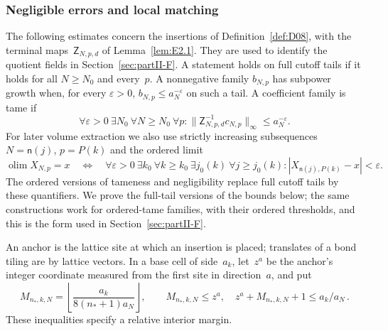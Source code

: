 \subsubsection{Negligible errors and local matching}\label{sec:partII-E.2.3}

The following estimates concern the insertions of Definition~\ref{def:D08}, with the terminal maps~$\mathsf Z_{N,p,d}$ of Lemma~\ref{lem:E2.1}. They are used to identify the quotient fields in Section~\ref{sec:partII-F}. A statement holds on full cutoff tails if it holds for all $N\ge N_0$ and every~$p$. A nonnegative family $b_{N,p}$ has subpower growth when, for every $\varepsilon>0$, $b_{N,p}\le a_N^{-\varepsilon}$ on such a tail. A coefficient family is tame if
\begin{equation}\label{eq:F-subpower}
 \forall\varepsilon>0\ \exists N_0\ \forall N\ge N_0\ \forall p:
 \|\mathsf Z_{N,p,d}^{-1}c_{N,p}\|_\infty\le a_N^{-\varepsilon}.
\end{equation}
For later volume extraction we also use strictly increasing subsequences $N=\mathsf n(j)$, $p=P(k)$ and the ordered limit
\begin{equation}\label{eq:E2-tails}
 \operatorname*{olim}X_{N,p}=x
 \quad\Longleftrightarrow\quad
 \forall\varepsilon>0\ \exists k_0\ \forall k\ge k_0\ \exists j_0(k)\ \forall j\ge j_0(k):
 |X_{\mathsf n(j),P(k)}-x|<\varepsilon.
\end{equation}
The ordered versions of tameness and negligibility replace full cutoff tails by these quantifiers. We prove the full-tail versions of the bounds below; the same constructions work for ordered-tame families, with their ordered thresholds, and this is the form used in Section~\ref{sec:partII-F}.

An anchor is the lattice site at which an insertion is placed; translates of a bond tiling are by lattice vectors. In a base cell of side~$a_k$, let~$z^a$ be the anchor's integer coordinate measured from the first site in direction~$a$, and put
\begin{equation}\label{eq:E2-margin}
M_{n_*,k,N}=\left\lfloor\frac{a_k}{8(n_*+1)a_N}\right\rfloor,
\qquad M_{n_*,k,N}\le z^a,\quad z^a+M_{n_*,k,N}+1\le a_k/a_N\,.
\end{equation}
These inequalities specify a relative interior margin.

